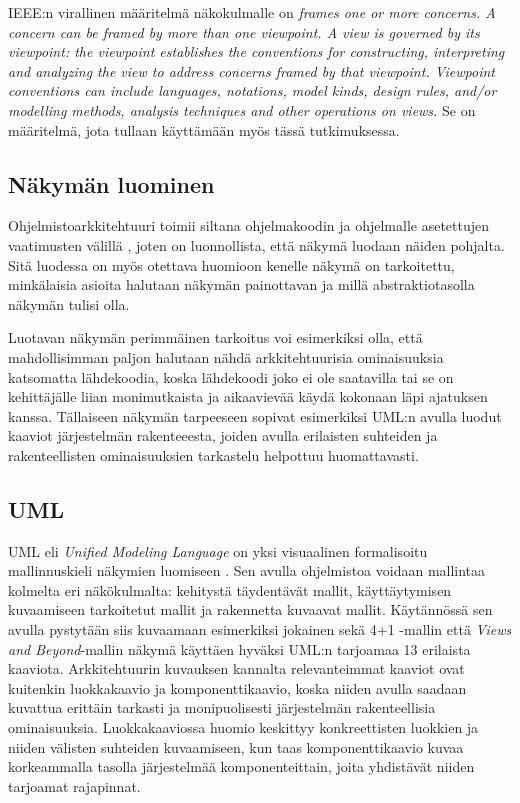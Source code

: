 \documentclass[finnish]{tktltiki2}
\numberwithin{table}{section}
\theoremstyle{definition}
\theoremstyle{remark}
\begin{document}
IEEE:n virallinen määritelmä näkokulmalle on \citep[s. 6]{ISOIEEE42010} \textit{frames one or more concerns. A concern can be framed by more than one
viewpoint.
A view is governed by its viewpoint: the viewpoint establishes the conventions for constructing, interpreting
and analyzing the view to address concerns framed by that viewpoint. Viewpoint conventions can include
languages, notations, model kinds, design rules, and/or modelling methods, analysis techniques and other
operations on views. } Se on määritelmä, jota tullaan käyttämään myös tässä tutkimuksessa.


\subsection{Näkymän luominen} %

Ohjelmistoarkkitehtuuri toimii siltana ohjelmakoodin ja ohjelmalle asetettujen vaatimusten välillä \citep[s. 94]{Garlan:2000:SAR:336512.336537}, joten on luonnollista, että näkymä luodaan näiden pohjalta. Sitä luodessa on myös otettava huomioon kenelle näkymä on tarkoitettu, minkälaisia asioita halutaan näkymän painottavan ja millä abstraktiotasolla näkymän tulisi olla. 


Luotavan näkymän perimmäinen tarkoitus voi esimerkiksi olla, että mahdollisimman paljon halutaan nähdä arkkitehtuurisia ominaisuuksia katsomatta lähdekoodia, koska lähdekoodi joko ei ole saatavilla tai se on kehittäjälle liian monimutkaista ja aikaavievää käydä kokonaan läpi ajatuksen kanssa. Tällaiseen näkymän tarpeeseen sopivat esimerkiksi UML:n avulla luodut kaaviot järjestelmän rakenteeesta, joiden avulla erilaisten suhteiden ja rakenteellisten ominaisuuksien tarkastelu helpottuu huomattavasti.

\subsection{UML}

UML eli \textit{Unified Modeling Language} on yksi visuaalinen formalisoitu mallinnuskieli näkymien luomiseen \citep{UML}. Sen avulla ohjelmistoa voidaan mallintaa kolmelta eri näkökulmalta: kehitystä täydentävät mallit, käyttäytymisen kuvaamiseen tarkoitetut mallit ja rakennetta kuvaavat mallit. Käytännössä sen avulla pystytään siis kuvaamaan esimerkiksi jokainen sekä 4+1 -mallin että \textit{Views and Beyond}-mallin näkymä käyttäen hyväksi UML:n tarjoamaa 13 erilaista kaaviota. Arkkitehtuurin kuvauksen kannalta relevanteimmat kaaviot ovat kuitenkin luokkakaavio ja komponenttikaavio, koska niiden avulla saadaan kuvattua erittäin tarkasti ja monipuolisesti järjestelmän rakenteellisia ominaisuuksia. Luokkakaaviossa huomio keskittyy konkreettisten luokkien ja niiden välisten suhteiden kuvaamiseen, kun taas komponenttikaavio kuvaa korkeammalla tasolla järjestelmää komponenteittain, joita yhdistävät niiden tarjoamat rajapinnat.   
\end{document}
